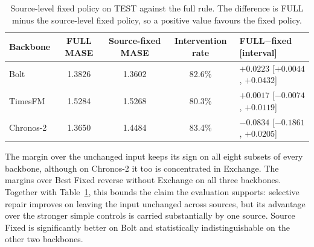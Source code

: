 \documentclass{article}
\begin{document}
\begin{table}[htbp]
\centering\small
\caption{Source-level fixed policy on TEST against the full rule. The difference is FULL
minus the source-level fixed policy, so a positive value favours the fixed policy.}
\label{tab:v53-source-fixed}
\begin{tabular}{lcccl}
\toprule
Backbone & FULL MASE & Source-fixed MASE & Intervention rate & FULL$-$fixed [interval] \\
\midrule
Bolt & 1.3826 & 1.3602 & 82.6\% & $+0.0223$ [$+0.0044$, $+0.0432$] \\
TimesFM & 1.5284 & 1.5268 & 80.3\% & $+0.0017$ [$-0.0074$, $+0.0119$] \\
Chronos-2 & 1.3650 & 1.4484 & 83.4\% & $-0.0834$ [$-0.1861$, $+0.0205$] \\
\bottomrule
\end{tabular}
\end{table}

\begin{table}[htbp]
\centering\small
\caption{Leave-one-source-out on TEST: the FULL-minus-control difference in source-macro
MASE with each source removed in turn. Only the full set and the Exchange-excluded subset
are printed; the other leave-one-source-out values are stored in
\texttt{results/v55/source\_diagnostics.json}. A negative value favours FULL.}
\label{tab:v53-loso}
\end{table}

The margin over the unchanged input keeps its sign on all eight subsets of every backbone,
although on Chronos-2 it too is concentrated in Exchange. The margins over Best Fixed
reverse without Exchange on all three backbones. Together with
Table~\ref{tab:v53-source-fixed}, this bounds the claim the evaluation supports: selective
repair improves on leaving the input unchanged across sources, but its advantage over the
stronger simple controls is carried substantially by one source. Source Fixed is significantly
better on Bolt and statistically indistinguishable on the other two backbones.
\end{document}
